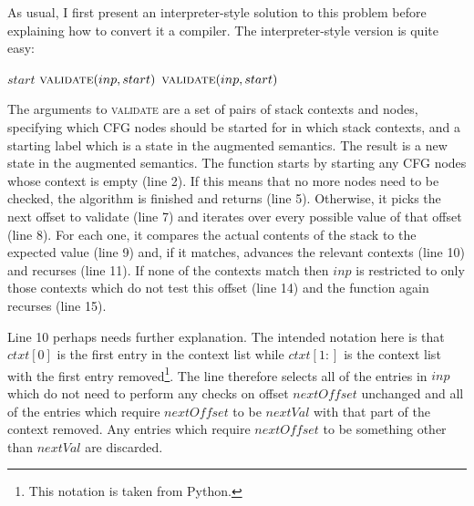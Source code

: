As usual, I first present an interpreter-style solution to this
problem before explaining how to convert it a compiler.  The
interpreter-style version is quite easy:

\begin{algorithmic}[1]
      \State \Return $start$
    \EndIf
        \State \Return $\textsc{validate}(inp, start)$
      \EndIf
    \EndFor
    \State \Return $\textsc{validate}(inp, start)$
  \EndFunction
\end{algorithmic}

The arguments to \textsc{validate} are a set of pairs of stack
contexts and nodes, specifying which CFG nodes should be started for
in which stack contexts, and a starting label which is a state in the
augmented semantics.  The result is a new state in the augmented
semantics.  The function starts by starting any CFG nodes whose
context is empty (line 2).  If this means that no more nodes need to
be checked, the algorithm is finished and returns (line 5).
Otherwise, it picks the next offset to validate (line 7) and iterates
over every possible value of that offset (line 8).  For each one, it
compares the actual contents of the stack to the expected value (line
9) and, if it matches, advances the relevant contexts (line 10) and
recurses (line 11).  If none of the contexts match then $inp$ is
restricted to only those contexts which do not test this offset (line
14) and the function again recurses (line 15).

Line 10 perhaps needs further explanation.  The intended notation here
is that $ctxt[0]$ is the first entry in the context list while
$ctxt[1:]$ is the context list with the first entry
removed\footnote{This notation is taken from Python\needCite{}.}.  The
line therefore selects all of the entries in $inp$ which do not need
to perform any checks on offset $nextOffset$ unchanged and all of the
entries which require $nextOffset$ to be $nextVal$ with that part of
the context removed.  Any entries which require $nextOffset$ to be
something other than $nextVal$ are discarded.

